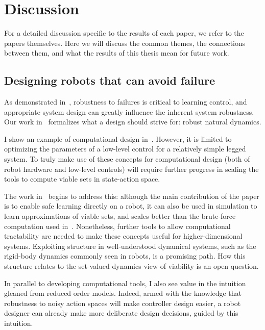 
\chapter{Discussion}\label{chap:discussion}

For a detailed discussion specific to the results of each paper, we refer to the papers themselves. Here we will discuss the common themes, the connections between them, and what the results of this thesis mean for future work.

\section{Designing robots that can avoid failure}

As demonstrated in~\cite{heim2018shaping}, robustness to failures is critical to learning control, and appropriate system design can greatly influence the inherent system robustness. Our work in~\cite{heim2019beyond} formalizes what a design should strive for: robust natural dynamics. \par
I show an example of computational design in~\cite{heim2019beyond}. However, it is limited to optimizing the parameters of a low-level control for a relatively simple legged system. To truly make use of these concepts for computational design (both of robot hardware and low-level controls) will require further progress in scaling the tools to compute viable sets in state-action space. \par
The work in~\cite{heim2019learnable} begins to address this: although the main contribution of the paper is to enable safe learning directly on a robot, it can also be used in simulation to learn approximations of viable sets, and scales better than the brute-force computation used in~\cite{heim2019beyond}.
Nonetheless, further tools to allow computational tractability are needed to make these concepts useful for higher-dimensional systems. Exploiting structure in well-understood dynamical systems, such as the rigid-body dynamics commonly seen in robots, is a promising path. How this structure relates to the set-valued dynamics view of viability is an open question. \par
In parallel to developing computational tools, I also see value in the intuition gleaned from reduced order models. Indeed, armed with the knowledge that robustness to noisy action spaces will make controller design easier, a robot designer can already make more deliberate design decisions, guided by this intuition.

